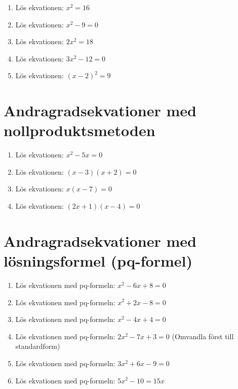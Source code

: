 \documentclass[a4paper,11pt]{article}
\begin{document}
\begin{enumerate}[label=\textbf{\arabic*.}]
    \item Lös ekvationen: $x^2 = 16$
    
    \item Lös ekvationen: $x^2 - 9 = 0$
    
    \item Lös ekvationen: $2x^2 = 18$
    
    \item Lös ekvationen: $3x^2 - 12 = 0$
    
    \item Lös ekvationen: $(x - 2)^2 = 9$
\end{enumerate}

\section{Andragradsekvationer med nollproduktsmetoden}

\begin{enumerate}[label=\textbf{\arabic*.}]
    \item Lös ekvationen: $x^2 - 5x = 0$
    
    \item Lös ekvationen: $(x - 3)(x + 2) = 0$
    
    \item Lös ekvationen: $x(x - 7) = 0$
    
    \item Lös ekvationen: $(2x + 1)(x - 4) = 0$
\end{enumerate}

\section{Andragradsekvationer med lösningsformel (pq-formel)}

\begin{enumerate}[label=\textbf{\arabic*.}]
    \item Lös ekvationen med pq-formeln: $x^2 - 6x + 8 = 0$
    
    \item Lös ekvationen med pq-formeln: $x^2 + 2x - 8 = 0$
    
    \item Lös ekvationen med pq-formeln: $x^2 - 4x + 4 = 0$
    
    \item Lös ekvationen med pq-formeln: $2x^2 - 7x + 3 = 0$ (Omvandla först till standardform)
    
    \item Lös ekvationen med pq-formeln: $3x^2 + 6x - 9 = 0$ 
    
    \item Lös ekvationen med pq-formeln: $5x^2 - 10 = 15x$ 
\end{enumerate}
\end{document}
